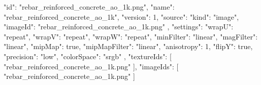 {
  "id": "rebar_reinforced_concrete_ao_1k.png",
  "name": "rebar_reinforced_concrete_ao_1k",
  "version": 1,
  "source": {
    "kind": "image",
    "imageId": "rebar_reinforced_concrete_ao_1k.png"
  },
  "settings": {
    "wrapU": "repeat",
    "wrapV": "repeat",
    "wrapW": "repeat",
    "minFilter": "linear",
    "magFilter": "linear",
    "mipMap": true,
    "mipMapFilter": "linear",
    "anisotropy": 1,
    "flipY": true,
    "precision": "low",
    "colorSpace": "srgb"
  },
  "textureIds": [
    "rebar_reinforced_concrete_ao_1k.png"
  ],
  "imageIds": [
    "rebar_reinforced_concrete_ao_1k.png"
  ]
}
